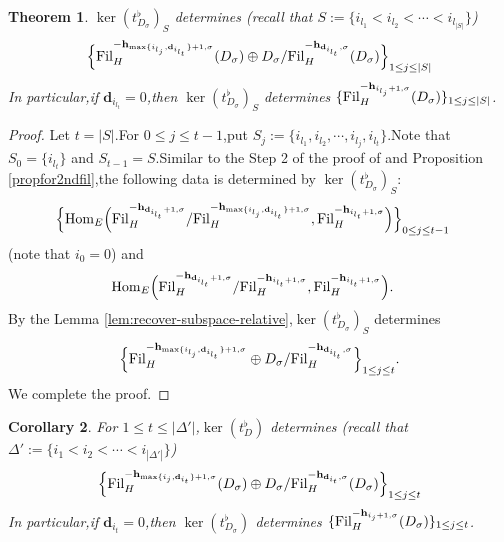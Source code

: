 \documentclass[10pt]{article}
\newtheorem{thm}{Theorem}[section]
\newtheorem{cor}[thm]{Corollary}
\newcommand{\fil}{{\rm Fil}}
\newcommand{\homo}{{\rm Hom}}
\newcommand{\bh}{{\mathbf{h}}}
\newcommand{\bd}{{\mathbf{d}}}
\begin{document}
\begin{thm}\label{Hodgeparadeter}$\ker(t^{\flat}_{D_{\sigma}})_S$ determines (recall that $S:=\{i_{l_1}<i_{l_2}<\cdots<i_{l_{|S|}}\}$)
	\begin{equation}
	\begin{aligned}
		\Big\{\fil_H^{-\bh_{{\max\{i_{l_{j}},\bd_{i_{l_t}}\}}+1,\sigma}}(D_{\sigma})\oplus D_{\sigma}/\fil_H^{-\bh_{\bd_{i_{l_t}},\sigma}}(D_{\sigma})\Big\}_{1\leq j\leq |S|}
	\end{aligned}
\end{equation}	
In particular,\;if $\bd_{i_{l_t}}=0$,\;then $\ker(t^{\flat}_{D_{\sigma}})_S$ determines $\{\fil_H^{-\bh_{i_{l_{j}}+1,\sigma}}(D_{\sigma})\}_{1\leq j\leq |S|}$.\;
\end{thm}
\begin{proof}
	Let $t=|S|$.\;For $0\leq j\leq t-1$,\;put $S_j:=\{i_{l_1},i_{l_2},\cdots,i_{l_j},i_{l_t}\}$.\;Note that $S_0=\{i_{l_t}\}$ and $S_{t-1}=S$.\;Similar to the Step 2 of the proof of \cite[2.3.10]{BDcritical25} and Proposition \ref{propfor2ndfil},\;the following data is determined by  $\ker(t^{\flat}_{D_{\sigma}})_S$:
	\begin{equation}
		\begin{aligned}
			&\Big\{\homo_E\Big(\fil_H^{-\bh_{\bd_{i_{l_t}}+1,\sigma}}/\fil_H^{-\bh_{{\max\{i_{l_{j}},\bd_{i_{l_t}}\}}+1,\sigma}},\fil_H^{-\bh_{i_{l_t}+1,\sigma}}\Big)\Big\}_{0\leq j\leq t-1}
		\end{aligned}
	\end{equation}
(note that $i_0=0$) and 
	\begin{equation}
	\begin{aligned}
		&\homo_E\Big(\fil_H^{-\bh_{\bd_{i_{l_t}}+1,\sigma}}/\fil_H^{-\bh_{i_{l_{t}}+1,\sigma}},\fil_H^{-\bh_{i_{l_t}+1,\sigma}}\Big).
	\end{aligned}
\end{equation}
By the Lemma \ref{lem:recover-subspace-relative},\;$\ker(t^{\flat}_{D_{\sigma}})_S$ determines 
	\begin{equation}
	\begin{aligned}
		\Big\{\fil_H^{-\bh_{{\max\{i_{l_{j}},\bd_{i_{l_t}}\}}+1,\sigma}}\oplus D_{\sigma}/\fil_H^{-\bh_{\bd_{i_{l_t}},\sigma}}\Big\}_{1\leq j\leq t}.
	\end{aligned}
\end{equation}
We complete the proof.\;
\end{proof}

\begin{cor}\label{Hodgeparadetercor} For $1\leq t\leq |\Delta'|$,\;$\ker(t^{\flat}_{D})$ determines  (recall that $\Delta':=\{i_1<i_2<\cdots<i_{|\Delta'|}\}$)
	\begin{equation}
		\begin{aligned}
			\Big\{\fil_H^{-\bh_{{\max\{i_{{j}},\bd_{i_t}\}}+1,\sigma}}(D_{\sigma})\oplus D_{\sigma}/\fil_H^{-\bh_{\bd_{i_t},\sigma}}(D_{\sigma})\Big\}_{1\leq j\leq t}
		\end{aligned}
	\end{equation}	
	In particular,\;if $\bd_{i_{t}}=0$,\;then $\ker(t^{\flat}_{D_{\sigma}})$ determines $\{\fil_H^{-\bh_{i_{j}+1,\sigma}}(D_{\sigma})\}_{1\leq j\leq t}$.\;
\end{cor}
\end{document}
